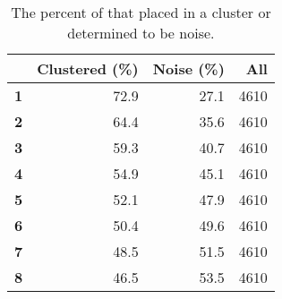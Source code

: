 \begin{table}[ht!]
\setlength{\arrayrulewidth}{1pt}
\centering
\begin{tabular}{|r|r|r|r|}
\hline
\bf \minneigh{}&\bf Clustered (\%)&\bf Noise (\%)&\bf All \Isols{}
\\
\hline
\hline
\bf 1 & 72.9 & 27.1 & 4610
\\
\hline
\bf 2 & 64.4 & 35.6 & 4610
\\
\hline
\bf 3 & 59.3 & 40.7 & 4610
\\
\hline
\bf 4 & 54.9 & 45.1 & 4610
\\
\hline
\bf 5 & 52.1 & 47.9 & 4610
\\
\hline
\bf 6 & 50.4 & 49.6 & 4610
\\
\hline
\bf 7 & 48.5 & 51.5 & 4610
\\
\hline
\bf 8 & 46.5 & 53.5 & 4610
\\
\hline
\end{tabular}
\caption{The percent of \isols{} that \dbscan{} placed in a cluster or determined to be noise.}
\label{tab:coverage:percent:clustered:noise}
\end{table}

